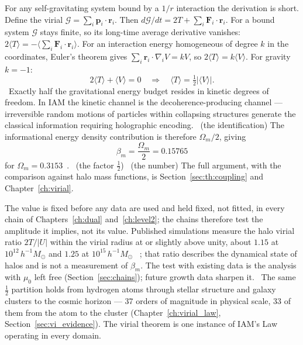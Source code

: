 For any self-gravitating system bound by a $1/r$ interaction the derivation is short. Define the virial $\mathcal G=\sum_i\mathbf p_i\cdot\mathbf r_i$. Then
$d\mathcal G/dt=2T+\sum_i\mathbf F_i\cdot\mathbf r_i$. For a bound system $\mathcal G$ stays finite, so its long-time average derivative vanishes:
$2\langle T\rangle=-\langle\sum_i\mathbf F_i\cdot\mathbf r_i\rangle$. For an interaction energy homogeneous of degree $k$ in the coordinates, Euler's theorem gives
$\sum_i\mathbf r_i\cdot\nabla_iV=kV$, so $2\langle T\rangle=k\langle V\rangle$. For gravity $k=-1$:
\begin{equation}2\langle T\rangle+\langle V\rangle=0\quad\Longrightarrow\quad\langle T\rangle=\tfrac12|\langle V\rangle| .\label{eq:eg_virial}\end{equation}
\derived\ Exactly half the gravitational energy budget resides in kinetic degrees of freedom. In IAM the kinetic channel is the decoherence-producing
channel --- irreversible random motions of particles within collapsing structures generate the classical information requiring holographic encoding.
\conjecture\ (the identification) The informational energy density contribution is therefore $\Omega_m/2$, giving
\begin{equation}\beta_m=\frac{\Omega_m}{2}=0.15765\label{eq:eg_beta}\end{equation}
for $\Omega_m=0.3153$~\cite{Planck2018VI}. \derived\ (the factor $\tfrac12$) \calc\ (the number) The full argument, with the comparison against halo mass
functions, is Section~\ref{sec:th:coupling} and Chapter~\ref{ch:virial}.

The value is fixed before any data are used and held fixed, not fitted, in every chain of Chapters~\ref{ch:dual} and~\ref{ch:level2}; the chains therefore
test the amplitude it implies, not its value. Published simulations measure the halo virial ratio $2T/|U|$ within the virial radius at or slightly above
unity, about $1.15$ at $10^{12}\,h^{-1}M_\odot$ and $1.25$ at $10^{15}\,h^{-1}M_\odot$~\cite{Neto2007,Power2012} \observed; that ratio describes the dynamical
state of halos and is not a measurement of $\beta_m$. The test with existing data is the analysis with $\mu_0$ left free (Section~\ref{sec:chains}); future
growth data sharpen it. \prediction\ The same $\tfrac12$ partition holds from hydrogen atoms through stellar structure and galaxy clusters to the cosmic horizon --- 37 orders of
magnitude in physical scale, 33 of them from the atom to the cluster (Chapter~\ref{ch:virial_law}, Section~\ref{sec:vi_evidence}). The virial theorem is one instance of IAM's Law operating in every
domain.

